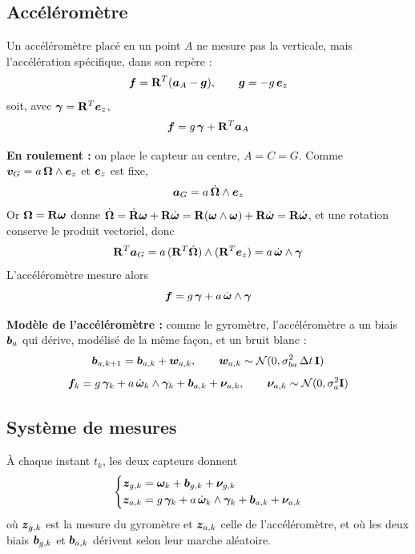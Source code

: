 \subsection{Accéléromètre}

Un accéléromètre placé en un point $A$ ne mesure pas la verticale, mais
l'accélération spécifique, dans son repère :
\[
    \bm{f} = \mathbf{R}^T(\bm{a}_A - \bm{g}),
    \qquad \bm{g} = -g\,\bm{e}_z
\]
soit, avec $\bm{\gamma} = \mathbf{R}^T\bm{e}_z$,
\[
    \bm{f} = g\,\bm{\gamma} + \mathbf{R}^T\bm{a}_A
\]

\textbf{En roulement : } on place le capteur au centre, $A = C = G$.
Comme $\bm{v}_G = a\,\bm{\Omega}\wedge\bm{e}_z$ et $\bm{e}_z$
est fixe,
\[
    \bm{a}_G = a\,\dot{\bm{\Omega}}\wedge\bm{e}_z
\]
Or $\bm{\Omega} = \mathbf{R}\bm{\omega}$ donne
$\dot{\bm{\Omega}} = \dot{\mathbf{R}}\bm{\omega} + \mathbf{R}\dot{\bm{\omega}}
= \mathbf{R}(\bm{\omega}\wedge\bm{\omega}) + \mathbf{R}\dot{\bm{\omega}}
= \mathbf{R}\dot{\bm{\omega}}$, et une rotation conserve le produit
vectoriel, donc
\[
    \mathbf{R}^T\bm{a}_G = a\,(\mathbf{R}^T\dot{\bm{\Omega}})\wedge(\mathbf{R}^T\bm{e}_z)
    = a\,\dot{\bm{\omega}}\wedge\bm{\gamma}
\]
L'accéléromètre mesure alors
\[
    \bm{f} = g\,\bm{\gamma} + a\,\dot{\bm{\omega}}\wedge\bm{\gamma}
\]

\textbf{Modèle de l'accéléromètre : } comme le gyromètre, l'accéléromètre a un biais
$\bm{b}_a$ qui dérive, modélisé de la même façon, et un bruit blanc :
\[
    \bm{b}_{a,k+1} = \bm{b}_{a,k} + \bm{w}_{a,k},
    \qquad
    \bm{w}_{a,k} \sim \mathcal{N}(0, \sigma_{ba}^2\,\Delta t\,\mathbf{I})
\]
\[
    \bm{f}_k = g\,\bm{\gamma}_k + a\,\dot{\bm{\omega}}_k\wedge\bm{\gamma}_k
    + \bm{b}_{a,k} + \bm{\nu}_{a,k},
    \qquad
    \bm{\nu}_{a,k} \sim \mathcal{N}(0, \sigma_a^2\mathbf{I})
\]

\subsection{Système de mesures}

À chaque instant $t_k$, les deux capteurs donnent
\[
    \left\{
    \begin{aligned}
        \bm{z}_{g,k} &= \bm{\omega}_k + \bm{b}_{g,k} + \bm{\nu}_{g,k}\\
        \bm{z}_{a,k} &= g\,\bm{\gamma}_k + a\,\dot{\bm{\omega}}_k\wedge\bm{\gamma}_k
        + \bm{b}_{a,k} + \bm{\nu}_{a,k}
    \end{aligned}
    \right.
\]
où $\bm{z}_{g,k}$ est la mesure du gyromètre et $\bm{z}_{a,k}$ celle
de l'accéléromètre, et où les deux biais $\bm{b}_{g,k}$ et
$\bm{b}_{a,k}$ dérivent selon leur marche aléatoire.